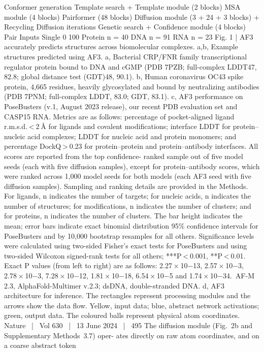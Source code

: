 Conformer
generation
Template
search
+
Template
module
(2 blocks)
MSA
module
(4 blocks)
Pairformer
(48 blocks)
Diffusion
module
(3 + 24 + 3 blocks)
+
Recycling
Diffusion iterations
Genetic
search
+
Conﬁdence
module
(4 blocks)
Pair
Inputs
Single
0
100
Protein
n = 40
DNA
n = 91
RNA
n = 23
Fig. 1 | AF3 accurately predicts structures across biomolecular complexes.
a,b, Example structures predicted using AF3. a, Bacterial CRP/FNR family
transcriptional regulator protein bound to DNA and cGMP (PDB 7PZB;
full-complex LDDT47, 82.8; global distance test (GDT)48, 90.1). b, Human
coronavirus OC43 spike protein, 4,665 residues, heavily glycosylated and
bound by neutralizing antibodies (PDB 7PNM; full-complex LDDT, 83.0; GDT,
83.1). c, AF3 performance on PoseBusters (v.1, August 2023 release), our recent
PDB evaluation set and CASP15 RNA. Metrics are as follows: percentage of
pocket-aligned ligand r.m.s.d. < 2 Å for ligands and covalent modifications;
interface LDDT for protein–nucleic acid complexes; LDDT for nucleic acid and
protein monomers; and percentage DockQ > 0.23 for protein–protein and
protein–antibody interfaces. All scores are reported from the top confidence-
ranked sample out of five model seeds (each with five diffusion samples),
except for protein–antibody scores, which were ranked across 1,000 model
seeds for both models (each AF3 seed with five diffusion samples). Sampling
and ranking details are provided in the Methods. For ligands, n indicates the
number of targets; for nucleic acids, n indicates the number of structures; for
modifications, n indicates the number of clusters; and for proteins, n indicates
the number of clusters. The bar height indicates the mean; error bars indicate
exact binomial distribution 95\% confidence intervals for PoseBusters and by
10,000 bootstrap resamples for all others. Significance levels were calculated
using two-sided Fisher’s exact tests for PoseBusters and using two-sided
Wilcoxon signed-rank tests for all others; ***P < 0.001, **P < 0.01. Exact P values
(from left to right) are as follows: 2.27 × 10−13, 2.57 × 10−3, 2.78 × 10−3, 7.28 × 10−12,
1.81 × 10−18, 6.54 × 10−5 and 1.74 × 10−34. AF-M 2.3, AlphaFold-Multimer v.2.3;
dsDNA, double-stranded DNA. d, AF3 architecture for inference. The rectangles
represent processing modules and the arrows show the data flow. Yellow, input
data; blue, abstract network activations; green, output data. The coloured balls
represent physical atom coordinates.
Nature  |  Vol 630  |  13 June 2024  |  495
The diffusion module (Fig. 2b and Supplementary Methods 3.7) oper-
ates directly on raw atom coordinates, and on a coarse abstract token
